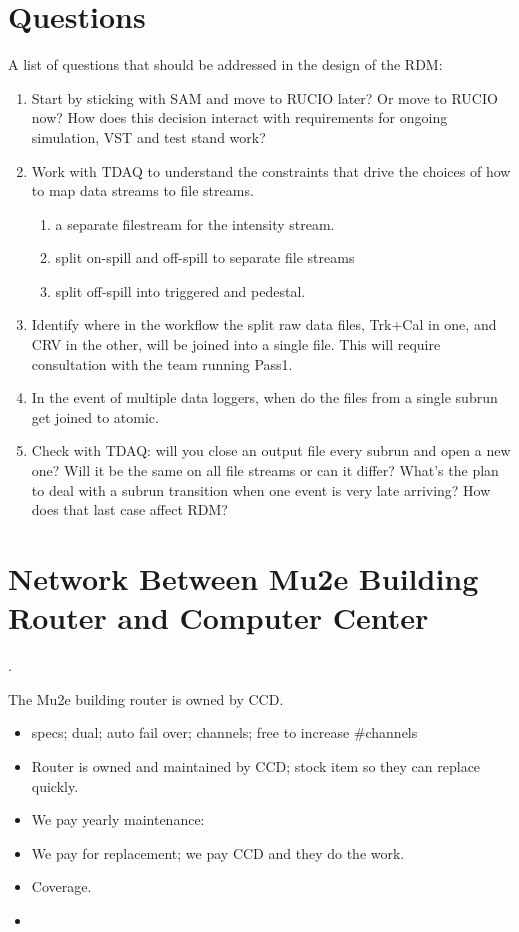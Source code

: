 \chapter{Questions}

A list of questions that should be addressed in the design of the RDM:

\begin{enumerate}
\item Start by sticking with SAM and move to RUCIO later?  Or move to RUCIO now?
  How does this decision interact with requirements for ongoing simulation, VST
  and test stand work?
\item Work with TDAQ to understand the constraints that drive the choices of how to
  map data streams to file streams.
  \begin{enumerate}
    \item a separate filestream for the intensity stream.
    \item split on-spill and off-spill to separate file streams
    \item split off-spill into triggered and pedestal.
  \end{enumerate}
\item Identify where in the workflow the split raw data files, Trk+Cal in one,
  and CRV in the other, will be joined into a single file.  This will require consultation with the team running
  Pass1.
\item In the event of multiple data loggers, when do the files from a single subrun get joined to atomic.
\item Check with TDAQ: will you close an output file every subrun and open a new one? Will it be the same
  on all file streams or can it differ?  What's the plan to deal with a subrun transition when one
  event is very late arriving?  How does that last case affect RDM?
\end{enumerate}


\appendix

\chapter{Network Between Mu2e Building Router and Computer Center}
\label{app:RouterAndNetwork}.

The Mu2e building router is owned by CCD.
\begin{itemize}
\item specs; dual; auto fail over; channels; free to increase \#channels
\item Router is owned and maintained by CCD; stock item so they can replace quickly.
\item We pay yearly maintenance: 
\item We pay for replacement; we pay CCD and they do the work. 
\item {} Coverage.
\item {}
\end{itemize}


